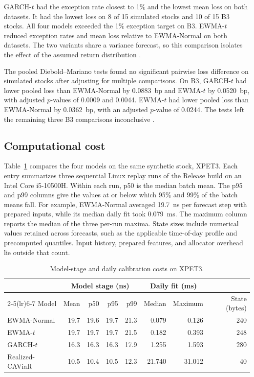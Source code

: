 \documentclass[
	12pt,				%
	openright,			%
	twoside,			%
	a4paper,
	chapter=TITLE,
	english				%
	]{abntex2}
\begin{document}
GARCH-$t$ had the exception rate closest to 1\% and the lowest mean loss on both datasets. It had the lowest loss on 8 of 15 simulated stocks and 10 of 15 B3 stocks. All four models exceeded the 1\% exception target on B3. EWMA-$t$ reduced exception rates and mean loss relative to EWMA-Normal on both datasets. The two variants share a variance forecast, so this comparison isolates the effect of the assumed return distribution \cite{project-comparison}.

The pooled Diebold--Mariano tests found no significant pairwise loss difference on simulated stocks after adjusting for multiple comparisons. On B3, GARCH-$t$ had lower pooled loss than EWMA-Normal by 0.0883~bp and EWMA-$t$ by 0.0520~bp, with adjusted $p$-values of 0.0009 and 0.0044. EWMA-$t$ had lower pooled loss than EWMA-Normal by 0.0362~bp, with an adjusted $p$-value of 0.0244. The tests left the remaining three B3 comparisons inconclusive \cite{project-comparison}.

\subsection{Computational cost}

Table~\ref{tab:cost} compares the four models on the same synthetic stock, XPET3. Each entry summarizes three sequential Linux replay runs of the Release build on an Intel Core i5-10500H. Within each run, p50 is the median batch mean. The p95 and p99 columns give the values at or below which 95\% and 99\% of the batch means fall. For example, EWMA-Normal averaged 19.7~ns per forecast step with prepared inputs, while its median daily fit took 0.079~ms. The maximum column reports the median of the three per-run maxima. State sizes include numerical values retained across forecasts, such as the applicable time-of-day profile and precomputed quantiles. Input history, prepared features, and allocator overhead lie outside that count.

\begin{table}[htbp]
\centering
\caption{Model-stage and daily calibration costs on XPET3.}
\label{tab:cost}
\small
\begin{tabular}{@{}lrrrrrrr@{}}
\toprule
 & \multicolumn{4}{c}{Model stage (ns)} & \multicolumn{2}{c}{Daily fit (ms)} & \\
\cmidrule(lr){2-5}\cmidrule(lr){6-7}
Model & Mean & p50 & p95 & p99 & Median & Maximum & State (bytes) \\
\midrule
EWMA-Normal     & 19.7 & 19.6 & 19.7 & 21.3 & 0.079 & 0.126 & 240 \\
EWMA-$t$        & 19.7 & 19.7 & 19.7 & 21.5 & 0.182 & 0.393 & 248 \\
GARCH-$t$       & 16.3 & 16.3 & 16.3 & 17.9 & 1.255 & 1.593 & 280 \\
Realized-CAViaR & 10.5 & 10.4 & 10.5 & 12.3 & 21.740 & 31.012 & 40 \\
\bottomrule
\end{tabular}
\end{table}
\end{document}
